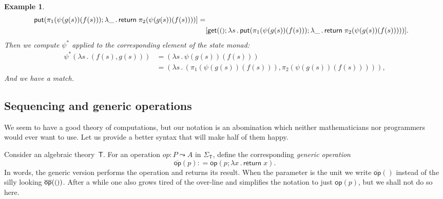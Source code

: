 \documentclass{amsart}
\newcommand{\theory}[1]{\mathsf{#1}} %
\newcommand{\signature}[1]{\Sigma_{\theory{#1}}} %
\newcommand{\lam}[1]{\lambda #1 \,.\,}
\newcommand{\opdecl}[3]{#1 : #2 \leadsto #3} %
\newcommand{\unit}{{\text{\small$()$}}} %
\newcommand{\defeq}{\mathbin{{:}{=}}} %
\newcommand{\kode}[1]{\mathsf{#1}}
\newcommand{\xopgen}[2]{\overline{#1}(#2)}
\newcommand{\opgen}[2]{\xopgen{\kode{#1}}{#2}}
\newcommand{\opcall}[3]{\kode{#1}(#2; #3)}
\newcommand{\return}[1]{\kode{return}\;#1}
\newtheorem{example}[definition]{Example}
\begin{document}
\begin{example}
\begin{align*}
{{      \opcall{put}{\pi_1 (\psi(g(s))(f(s)))}{\lam{\_} \return{\pi_2 (\psi(g(s))(f(s)))}}
    }}] = \\
    &[\opcall{get}{\unit}{\lam{s}
      \opcall{put}{\pi_1 (\psi(g(s))(f(s)))}{\lam{\_} \return{\pi_2 (\psi(g(s))(f(s)))}}
    }].
  \end{align*}
  Then we compute $\psi^{*}$ applied to the corresponding element of the state monad:
  \begin{align*}
    \psi^{*}(\lam{s} (f(s), g(s)))
    &= (\lam{s} \psi(g(s))(f(s))) \\
    &= (\lam{s} (\pi_1 (\psi(g(s))(f(s))), \pi_2 (\psi(g(s))(f(s))))),
  \end{align*}
  And we have a match.
\end{example}


\subsection{Sequencing and generic operations}
\label{sec:sequ-gener-oper}

We seem to have a good theory of computations, but our notation is an
abomination which neither mathematicians nor programmers would ever want to use.
Let us provide a better syntax that will make half of them happy.

Consider an algebraic theory~$\theory{T}$. For an operation $\opdecl{op}{P}{A}$
in $\signature{T}$, define the corresponding \emph{generic operation}
%
\begin{equation*}
  \opgen{op}{p} \defeq \opcall{op}{p}{\lam{x} \return{x}}.
\end{equation*}
%
In words, the generic version performs the operation and returns its result.
When the parameter is the unit we write $\opgen{op}{}$ instead of the silly
looking $\opgen{op}{\unit}$. After a while one also grows tired of the over-line
and simplifies the notation to just $\kode{op}(p)$, but we shall not do so here.
\end{document}
